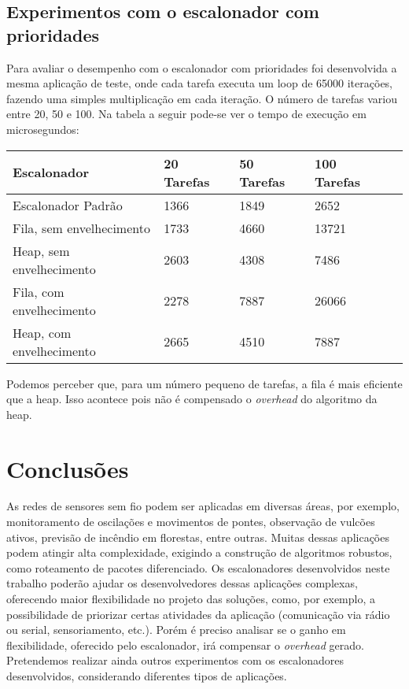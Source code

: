 \documentclass[a4paper,onecolumn, 10pt]{article}
\begin{document}
\subsection{Experimentos com o escalonador com prioridades}
Para avaliar o desempenho com o escalonador com prioridades foi desenvolvida a mesma aplicação de teste,
onde cada tarefa executa um loop de 65000 iterações, fazendo uma simples multiplicação em cada iteração. 
O número de tarefas variou entre 20, 50 e 100.
Na tabela a seguir pode-se ver o tempo de execução em microsegundos:
\begin{center}
    \begin{tabular}{ | l | l | l | l | p{5cm} |}
    \hline
    Escalonador              & 20 Tarefas & 50 Tarefas & 100 Tarefas \\ \hline
    Escalonador Padrão       & 1366 & 1849 & 2652 \\ \hline 
    Fila, sem envelhecimento & 1733 & 4660 & 13721 \\ \hline 
    Heap, sem envelhecimento & 2603 & 4308 & 7486 \\ \hline
    Fila, com envelhecimento & 2278 & 7887 & 26066 \\ \hline
    Heap, com envelhecimento & 2665 & 4510 & 7887 \\ \hline
    \end{tabular}
\end{center}

Podemos perceber que, para um número pequeno de tarefas, a fila é mais eficiente que a heap. Isso acontece pois
não é compensado o \textit{overhead} do algoritmo da heap.

\section{Conclusões}\label{conclusoes}
As redes de sensores sem fio podem ser aplicadas em diversas áreas, por exemplo, monitoramento de oscilações 
e movimentos de pontes, observação de vulcões ativos, previsão de incêndio em florestas, entre outras. 
Muitas dessas aplicações podem atingir alta complexidade, exigindo a construção de algoritmos robustos, 
como roteamento de pacotes diferenciado.
Os escalonadores desenvolvidos neste trabalho poderão ajudar os desenvolvedores dessas aplicações complexas,
oferecendo maior flexibilidade no projeto das soluções, como, por exemplo, 
a possibilidade de priorizar certas atividades da aplicação (comunicação via rádio ou serial, sensoriamento, etc.).
Porém é preciso analisar se o ganho em flexibilidade, oferecido pelo escalonador, irá compensar o
\textit{overhead} gerado.
Pretendemos realizar ainda outros experimentos com os escalonadores desenvolvidos, considerando diferentes
tipos de aplicações. 
\end{document}
